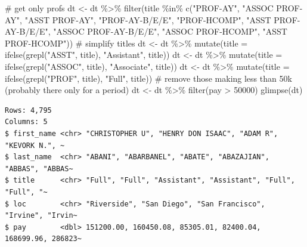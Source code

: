 \documentclass[
  letterpaper,
  DIV=11,
  numbers=noendperiod]{scrreprt}
\newenvironment{Shaded}{\begin{snugshade}}{\end{snugshade}}
\newcommand{\AttributeTok}[1]{\textcolor[rgb]{0.40,0.45,0.13}{#1}}
\newcommand{\CommentTok}[1]{\textcolor[rgb]{0.37,0.37,0.37}{#1}}
\newcommand{\DecValTok}[1]{\textcolor[rgb]{0.68,0.00,0.00}{#1}}
\newcommand{\FunctionTok}[1]{\textcolor[rgb]{0.28,0.35,0.67}{#1}}
\newcommand{\NormalTok}[1]{\textcolor[rgb]{0.00,0.23,0.31}{#1}}
\newcommand{\OtherTok}[1]{\textcolor[rgb]{0.00,0.23,0.31}{#1}}
\newcommand{\SpecialCharTok}[1]{\textcolor[rgb]{0.37,0.37,0.37}{#1}}
\newcommand{\StringTok}[1]{\textcolor[rgb]{0.13,0.47,0.30}{#1}}
\begin{document}
\begin{Shaded}
\begin{Highlighting}[]
\CommentTok{\# get only profs}
\NormalTok{dt }\OtherTok{\textless{}{-}}\NormalTok{ dt }\SpecialCharTok{\%\textgreater{}\%} \FunctionTok{filter}\NormalTok{(title }\SpecialCharTok{\%in\%} \FunctionTok{c}\NormalTok{(}\StringTok{"PROF{-}AY"}\NormalTok{, }\StringTok{"ASSOC PROF{-}AY"}\NormalTok{, }\StringTok{"ASST PROF{-}AY"}\NormalTok{, }
                                 \StringTok{"PROF{-}AY{-}B/E/E"}\NormalTok{, }\StringTok{"PROF{-}HCOMP"}\NormalTok{, }\StringTok{"ASST PROF{-}AY{-}B/E/E"}\NormalTok{, }
                                 \StringTok{"ASSOC PROF{-}AY{-}B/E/E"}\NormalTok{, }\StringTok{"ASSOC PROF{-}HCOMP"}\NormalTok{, }\StringTok{"ASST PROF{-}HCOMP"}\NormalTok{))}
\CommentTok{\# simplify titles}
\NormalTok{dt }\OtherTok{\textless{}{-}}\NormalTok{ dt }\SpecialCharTok{\%\textgreater{}\%} \FunctionTok{mutate}\NormalTok{(}\AttributeTok{title =} \FunctionTok{ifelse}\NormalTok{(}\FunctionTok{grepl}\NormalTok{(}\StringTok{"ASST"}\NormalTok{, title), }\StringTok{"Assistant"}\NormalTok{, title))}
\NormalTok{dt }\OtherTok{\textless{}{-}}\NormalTok{ dt }\SpecialCharTok{\%\textgreater{}\%} \FunctionTok{mutate}\NormalTok{(}\AttributeTok{title =} \FunctionTok{ifelse}\NormalTok{(}\FunctionTok{grepl}\NormalTok{(}\StringTok{"ASSOC"}\NormalTok{, title), }\StringTok{"Associate"}\NormalTok{, title))}
\NormalTok{dt }\OtherTok{\textless{}{-}}\NormalTok{ dt }\SpecialCharTok{\%\textgreater{}\%} \FunctionTok{mutate}\NormalTok{(}\AttributeTok{title =} \FunctionTok{ifelse}\NormalTok{(}\FunctionTok{grepl}\NormalTok{(}\StringTok{"PROF"}\NormalTok{, title), }\StringTok{"Full"}\NormalTok{, title))}
\CommentTok{\# remove those making less than 50k (probably there only for a period)}
\NormalTok{dt }\OtherTok{\textless{}{-}}\NormalTok{ dt }\SpecialCharTok{\%\textgreater{}\%} \FunctionTok{filter}\NormalTok{(pay }\SpecialCharTok{\textgreater{}} \DecValTok{50000}\NormalTok{)}
\FunctionTok{glimpse}\NormalTok{(dt)}
\end{Highlighting}
\end{Shaded}

\begin{verbatim}
Rows: 4,795
Columns: 5
$ first_name <chr> "CHRISTOPHER U", "HENRY DON ISAAC", "ADAM R", "KEVORK N.", ~
$ last_name  <chr> "ABANI", "ABARBANEL", "ABATE", "ABAZAJIAN", "ABBAS", "ABBAS~
$ title      <chr> "Full", "Full", "Assistant", "Assistant", "Full", "Full", "~
$ loc        <chr> "Riverside", "San Diego", "San Francisco", "Irvine", "Irvin~
$ pay        <dbl> 151200.00, 160450.08, 85305.01, 82400.04, 168699.96, 286823~
\end{verbatim}
\end{document}
